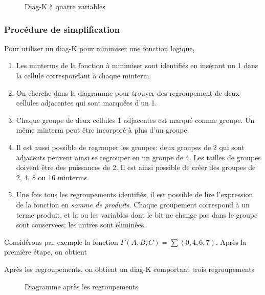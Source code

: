 \documentclass[11pt]{article}
\begin{document}
\begin{figure}[htbp]
\centering

\caption{\label{fig:org05813dd}Diag-K à quatre variables}
\end{figure}

\subsubsection{Procédure de simplification}
\label{sec:orgfdd26c2}

Pour utiliser un diag-K pour minimiser une fonction logique, 

\begin{enumerate}
\item Les minterms de la fonction à minimiser sont identifiés en insérant
un 1 dans la cellule correspondant à chaque minterm.
\item On cherche dans le diagramme pour trouver des regroupement de deux
cellules adjacentes qui sont marquées d'un 1.
\item Chaque groupe de deux cellules 1 adjacentes est marqué comme
groupe. Un même minterm peut être incorporé à plus d'un groupe.
\item Il est aussi possible de regrouper les groupes: deux groupes de 2
qui sont adjacents peuvent ainsi se regrouper en un groupe
de 4. Les tailles de groupes doivent être des puissances de 2. Il
est ainsi possible de créer des groupes de 2, 4, 8 ou 16 minterms.
\item Une fois tous les regroupements identifiés, il est possible de lire
l'expression de la fonction en \emph{somme de produits}. Chaque groupement
correspond à un terme produit, et la ou les variables dont le bit ne
change pas dans le groupe sont conservées; les autres sont
éliminées.
\end{enumerate}

Considérons par exemple la fonction \(F(A,B,C) = \sum (0, 4, 6,
7)\). Après la première étape, on obtient

\begin{center}

\label{orgdffecd6}
\end{center}

Après les regroupements, on obtient un diag-K comportant trois regroupements

\begin{figure}[htbp]
\centering

\caption{\label{fig:orga9249a3}Diagramme après les regroupements}
\end{figure}
\end{document}
